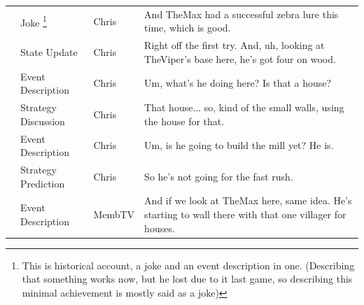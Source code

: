 {\begin{longtable}{@{}>{\theAppRow}r|L{2.3cm}L{1.0cm}U{11.55cm}@{}}
    & Joke \footnote{This is historical account, a joke and an event description in one. (Describing that something works now, but he lost due to it last game, so describing this minimal achievement is mostly said as a joke)}     & Chris        & And TheMax had a successful zebra lure this time, which is good.                                                                                                                                                                                                 \\
    & State Update          & Chris        & Right off the first try. And, uh, looking at TheViper's base here, he's got four on wood.                                                                                                                                                                        \\
    & Event Description     & Chris        & Um, what's he doing here? Is that a house?                                                                                                                                                                                                                       \\
    & Strategy Discussion   & Chris        & That house... so, kind of the small walls, using the house for that.                                                                                                                                                                                             \\
    & Event Description     & Chris        & Um, is he going to build the mill yet? He is.                                                                                                                                                                                                                    \\
    & Strategy Prediction   & Chris        & So he's not going for the fast rush.                                                                                                                                                                                                                             \\
    & Event Description     & MembTV       & And if we look at TheMax here, same idea. He's starting to wall there with that one villager for houses.                                                                                                                                                         \\

\end{longtable}}
